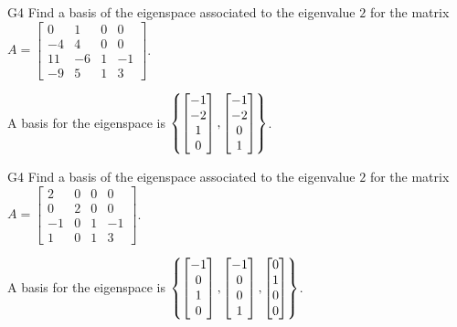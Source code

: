 \begin{problem}{G4}
Find a basis of the eigenspace associated to the eigenvalue \(2\) for the matrix 
\(A=\begin{bmatrix} 0 & 1 & 0 & 0 \\ -4 & 4 & 0 & 0 \\ 11 & -6 & 1 & -1 \\ -9 & 5 & 1 & 3 \end{bmatrix}\).
\end{problem}
\begin{solution}
A basis for the eigenspace is  $\left\{\begin{bmatrix} -1 \\ -2 \\ 1 \\ 0 \end{bmatrix},\begin{bmatrix} -1 \\ -2 \\ 0 \\ 1 \end{bmatrix}\right\}$.
\end{solution}

\begin{problem}{G4}
Find a basis of the eigenspace associated to the eigenvalue $2$ for the matrix $A=\begin{bmatrix} 2 & 0 & 0 & 0 \\ 0 & 2 & 0 & 0 \\ -1 & 0 & 1 & -1 \\ 1 & 0 & 1 & 3 \end{bmatrix}$.
\end{problem}
\begin{solution}
A basis for the eigenspace is  $\left\{\begin{bmatrix} -1 \\ 0 \\ 1 \\ 0 \end{bmatrix}, \begin{bmatrix} -1 \\ 0 \\ 0 \\ 1 \end{bmatrix},\begin{bmatrix} 0 \\ 1 \\ 0 \\ 0 \end{bmatrix}\right\}$.
\end{solution}

